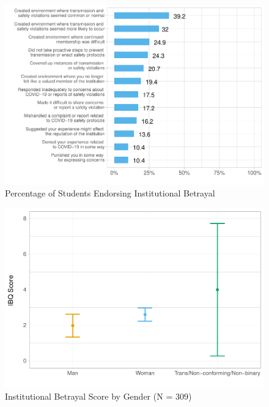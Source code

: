 \documentclass[
  english,
  man,draftall]{apa6}
\begin{document}
\begin{figure}[H]

{\centering \includegraphics[width=\textwidth]{papaja_doc_files/figure-latex/figure1-1} 

}

\caption{Percentage of Students Endorsing Institutional Betrayal
}\label{fig:figure1}
\end{figure}

\begin{figure}[H]

{\centering \includegraphics[width=\textwidth]{papaja_doc_files/figure-latex/figure2-1} 

}

\caption{Institutional Betrayal Score by Gender (N = 309) 
}\label{fig:figure2}
\end{figure}
\end{document}
